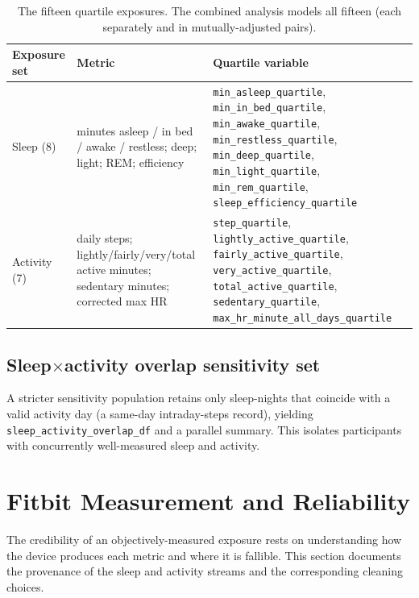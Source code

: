 \documentclass[11pt]{article}
\newcommand{\code}[1]{\texttt{\small #1}}
\begin{document}
\begin{table}[h]
\centering
\footnotesize
\begin{tabular}{@{}p{3.9cm}p{4.0cm}p{4.9cm}@{}}
\toprule
\textbf{Exposure set} & \textbf{Metric} & \textbf{Quartile variable} \\
\midrule
Sleep (8) & minutes asleep / in bed / awake / restless; deep; light; REM; efficiency &
\code{min_asleep_quartile}, \code{min_in_bed_quartile}, \code{min_awake_quartile},
\code{min_restless_quartile}, \code{min_deep_quartile}, \code{min_light_quartile},
\code{min_rem_quartile}, \code{sleep_efficiency_quartile} \\
\addlinespace
Activity (7) & daily steps; lightly/fairly/very/total active minutes; sedentary minutes; corrected max HR &
\code{step_quartile}, \code{lightly_active_quartile}, \code{fairly_active_quartile},
\code{very_active_quartile}, \code{total_active_quartile}, \code{sedentary_quartile},
\code{max_hr_minute_all_days_quartile} \\
\bottomrule
\end{tabular}
\caption{The fifteen quartile exposures. The combined analysis models all fifteen (each separately and
in mutually-adjusted pairs).}
\end{table}

\subsection{Sleep$\times$activity overlap sensitivity set}
A stricter sensitivity population retains only sleep-nights that coincide with a valid activity day
(a same-day intraday-steps record), yielding \code{sleep_activity_overlap_df} and a parallel summary.
This isolates participants with concurrently well-measured sleep and activity.

\section{Fitbit Measurement and Reliability}
The credibility of an objectively-measured exposure rests on understanding how the device produces each
metric and where it is fallible. This section documents the provenance of the sleep and activity streams
and the corresponding cleaning choices.
\end{document}
